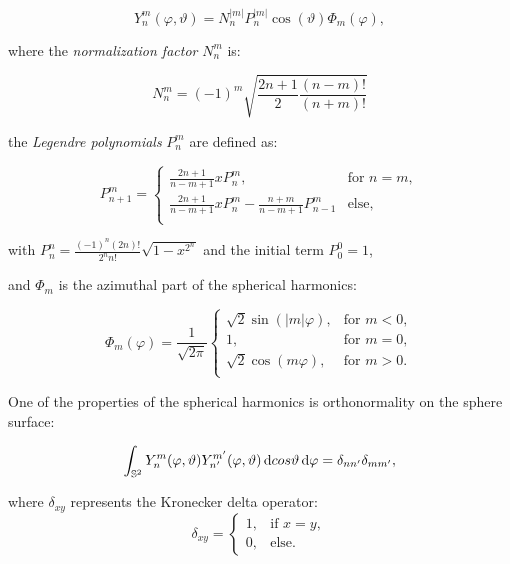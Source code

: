 \begin{equation}
	Y_n^m(\varphi, \vartheta) = N_n^{|m|} P_n^{|m|}\cos(\vartheta) \Phi_m(\varphi), 
	\label{eq:sphericalharmonics}
\end{equation}

where the \textit{normalization factor} $N_n^m$ is:

\begin{equation}
	N_n^m = (-1)^m \sqrt{\frac{2n+1}{2} \frac{(n-m)!}{(n+m)!}}
\end{equation}

the \textit{Legendre polynomials} $P_n^{m}$ are defined as: 

\begin{equation}
	P_{n+1}^{m} =
	\begin{cases}
 		\frac{2n+1}{n-m+1} x P_n^{m},  &\text{for } n = m,  \\
 		\frac{2n+1}{n-m+1} x P_n^{m} - \frac{n+m}{n-m+1}P_{n-1}^{m} &\text{else}, \\
 	\end{cases}
\end{equation}

with $P_{n}^{n} = \frac{(-1)^n(2n)!}{2^nn!}\sqrt{1-x^{2^n}}$
and the initial term $P_{0}^{0} = 1$, 

and $\Phi_m$ is the azimuthal part of the spherical harmonics: 

\begin{equation}
	\Phi_m(\varphi) = \frac{1}{\sqrt{2\pi}}
	\begin{cases}
    	\sqrt{2} \sin(|m|\varphi),  &\text{for } m < 0,  \\
    	1,  & \text{for } m = 0,  \\
    	\sqrt{2} \cos(m\varphi),  & \text{for } m > 0.  \\
  	\end{cases}
\end{equation}


One of the properties of the spherical harmonics is orthonormality on the sphere surface:

\begin{equation}
	\int_{\mathbb{S}^2} Y_n^m(\varphi, \vartheta) Y_{n'}^{m'}(\varphi, \vartheta) \mathop{}\!\mathrm{d} cos{\vartheta} \mathop{}\!\mathrm{d} \varphi = \delta_{nn'} \delta_{mm'},
	\label{eq:orthonormality}
\end{equation}

where $\delta_{xy}$ represents the Kronecker delta operator:
\begin{equation}
	\delta_{xy} = \begin{cases}
		1,  &\text{if } x = y,\\
		0,  &\text{else}.
	\end{cases}
\end{equation}

